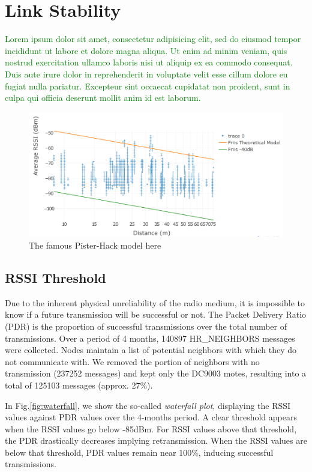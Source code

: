 \documentclass{sig-alternate}
\newcommand{\lorem}               {\textcolor{green}{Lorem ipsum dolor sit amet, consectetur adipisicing elit, sed do eiusmod tempor incididunt ut labore et dolore magna aliqua. Ut enim ad minim veniam, quis nostrud exercitation ullamco laboris nisi ut aliquip ex ea commodo consequat. Duis aute irure dolor in reprehenderit in voluptate velit esse cillum dolore eu fugiat nulla pariatur. Excepteur sint occaecat cupidatat non proident, sunt in culpa qui officia deserunt mollit anim id est laborum.}}
\begin{document}
\section{Link Stability}

\lorem

\begin{figure}
    \centering
    \includegraphics[width=\columnwidth]{pister_hack}
    \caption{The famous Pister-Hack model here}
    \label{fig:pister_hack}
\end{figure}

\subsection{RSSI Threshold}


Due to the inherent physical unreliability of the radio medium, it is impossible to know if a future transmission will be successful or not.
The Packet Delivery Ratio (PDR) is the proportion of successful transmissions over the total number of transmissions.
Over a period of 4 months, 140897 HR\_NEIGHBORS messages were collected.
Nodes maintain a list of potential neighbors with which they do not communicate with.
We removed the portion of neighbors with no transmission (237252 messages) and kept only the DC9003 motes, resulting into a total of 125103 messages (approx. 27\%).


In Fig.\ref{fig:waterfall}, we show the so-called \textit{waterfall plot}, displaying the RSSI values against PDR values over the 4-months period.
A clear threshold appears when the RSSI values go below -85dBm.
For RSSI values above that threshold, the PDR drastically decreases implying retransmission.
When the RSSI values are below that threshold, PDR values remain near 100\%, inducing successful transmissions.
\end{document}
